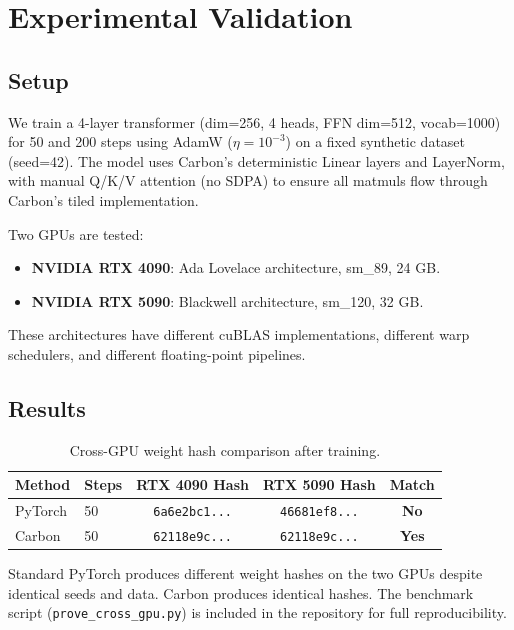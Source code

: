 \documentclass[11pt,a4paper]{article}
\begin{document}
\section{Experimental Validation}

\subsection{Setup}

We train a 4-layer transformer (dim=256, 4 heads, FFN dim=512, vocab=1000)
for 50 and 200 steps using AdamW ($\eta = 10^{-3}$) on a fixed synthetic
dataset (seed=42). The model uses Carbon's deterministic Linear layers and
LayerNorm, with manual Q/K/V attention (no SDPA) to ensure all matmuls
flow through Carbon's tiled implementation.

Two GPUs are tested:
\begin{itemize}
  \item \textbf{NVIDIA RTX 4090}: Ada Lovelace architecture, sm\_89, 24 GB.
  \item \textbf{NVIDIA RTX 5090}: Blackwell architecture, sm\_120, 32 GB.
\end{itemize}

These architectures have different cuBLAS implementations, different warp
schedulers, and different floating-point pipelines.

\subsection{Results}

\begin{table}[h]
\centering
\caption{Cross-GPU weight hash comparison after training.}
\label{tab:hashes}
\begin{tabular}{llccc}
\toprule
Method & Steps & RTX 4090 Hash & RTX 5090 Hash & Match \\
\midrule
PyTorch & 50 & \texttt{6a6e2bc1...} & \texttt{46681ef8...} & \textbf{No} \\
Carbon & 50 & \texttt{62118e9c...} & \texttt{62118e9c...} & \textbf{Yes} \\
\bottomrule
\end{tabular}
\end{table}

Standard PyTorch produces different weight hashes on the two GPUs
despite identical seeds and data. Carbon produces identical hashes.
The benchmark script (\texttt{prove\_cross\_gpu.py}) is included in the
repository for full reproducibility.
\end{document}
